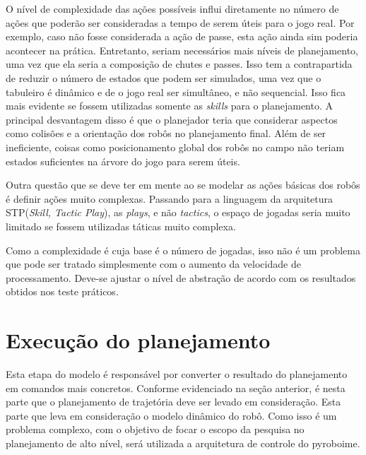O nível de complexidade das ações possíveis influi diretamente no número de ações que poderão
ser consideradas a tempo de serem úteis para o jogo real. Por exemplo, caso não fosse considerada
a ação de passe, esta ação ainda sim poderia acontecer na prática. Entretanto, seriam necessários
mais níveis de planejamento, uma vez que ela seria a composição de chutes e passes. Isso tem a
contrapartida de reduzir o número de estados que podem ser simulados, uma vez que o tabuleiro
é dinâmico e de o jogo real ser simultâneo, e não sequencial. Isso fica mais evidente se fossem
utilizadas somente as \textit{skills} para o planejamento. A principal desvantagem disso é que
o planejador teria que considerar aspectos como colisões e a orientação dos robôs no planejamento
final. Além de ser ineficiente, coisas como posicionamento global dos robôs no campo não teriam
estados suficientes na árvore do jogo para serem úteis.

Outra questão que se deve ter em mente ao se modelar as ações básicas dos robôs é definir ações
muito complexas. Passando para a linguagem da arquitetura STP(\textit{Skill, Tactic Play}),
as \textit{plays}, e não \textit{tactics}, o espaço de jogadas seria muito limitado se
fossem utilizadas táticas muito complexa.

Como a complexidade é cuja base é o número de jogadas, isso não é um problema que pode ser
tratado simplesmente com o aumento da velocidade de processamento. Deve-se ajustar o nível
de abstração de acordo com os resultados obtidos nos teste práticos.

\section{Execução do planejamento}

Esta etapa do modelo é responsável por converter o resultado do planejamento em comandos mais
concretos. Conforme evidenciado na seção anterior, é nesta parte que o planejamento de trajetória
deve ser levado em consideração. Esta parte que leva em consideração o modelo dinâmico do robô.
Como isso é um problema complexo, com o objetivo de focar o escopo da pesquisa no planejamento
de alto nível, será utilizada a arquitetura de controle do pyroboime.

